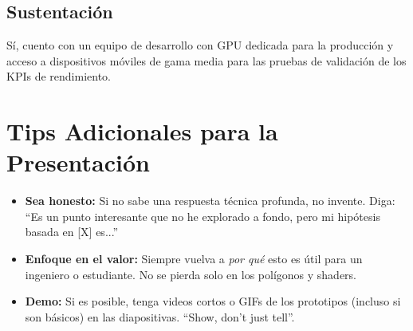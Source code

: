 \documentclass[11pt]{article}
\begin{document}
\subsection*{Sustentación}
Sí, cuento con un equipo de desarrollo con GPU dedicada para la producción y acceso a dispositivos móviles de gama media para las pruebas de validación de los KPIs de rendimiento.

\section{Tips Adicionales para la Presentación}

\begin{itemize}
\item \textbf{Sea honesto:} Si no sabe una respuesta técnica profunda, no invente. Diga: ``Es un punto interesante que no he explorado a fondo, pero mi hipótesis basada en [X] es...''
\item \textbf{Enfoque en el valor:} Siempre vuelva a \textit{por qué} esto es útil para un ingeniero o estudiante. No se pierda solo en los polígonos y shaders.
\item \textbf{Demo:} Si es posible, tenga videos cortos o GIFs de los prototipos (incluso si son básicos) en las diapositivas. ``Show, don't just tell''.
\end{itemize}
\end{document}
